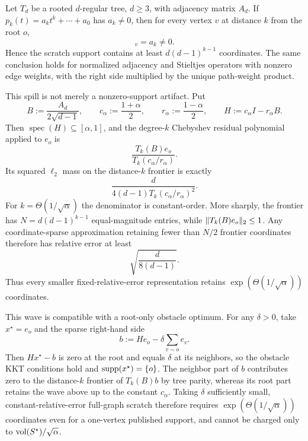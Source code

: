 \begin{proposition}
\label{prop:aesp-cd-polynomial-scratch-spill-stop}
Let $T_d$ be a rooted $d$-regular tree, $d\geq3$, with adjacency matrix
$A_d$.  If
$p_k(t)=a_kt^k+\cdots+a_0$ has $a_k\neq0$, then for every vertex $v$ at
distance $k$ from the root $o$,
\begin{equation}
 [p_k(A_d)e_o]_v=a_k\neq0.
 \label{eq:aesp-cd-polynomial-scratch-spill}
\end{equation}
Hence the scratch support contains at least
$d(d-1)^{k-1}$ coordinates.  The same conclusion holds for normalized
adjacency and Stieltjes operators with nonzero edge weights, with the right
side multiplied by the unique path-weight product.

This spill is not merely a nonzero-support artifact.  Put
\begin{equation*}
 B:=\frac{A_d}{2\sqrt{d-1}},\qquad
 c_\alpha:=\frac{1+\alpha}{2},\qquad
 r_\alpha:=\frac{1-\alpha}{2},\qquad
 H:=c_\alpha I-r_\alpha B.
\end{equation*}
Then $\operatorname{spec}(H)\subseteq[\alpha,1]$, and the degree-$k$ Chebyshev residual
polynomial applied to $e_o$ is
\begin{equation*}
 \frac{T_k(B)e_o}{T_k(c_\alpha/r_\alpha)}.
\end{equation*}
Its squared $\ell_2$ mass on the distance-$k$ frontier is exactly
\begin{equation}
 \frac{d}{4(d-1)T_k(c_\alpha/r_\alpha)^2}.
 \label{eq:aesp-cd-chebyshev-frontier-mass}
\end{equation}
For $k=\Theta(1/\sqrt\alpha)$ the denominator is constant-order.  More
sharply, the frontier has $N=d(d-1)^{k-1}$ equal-magnitude entries, while
$\lVert T_k(B)e_o\rVert_2\leq1$.  Any coordinate-sparse approximation retaining
fewer than $N/2$ frontier coordinates therefore has relative error at least
\begin{equation*}
 \sqrt{\frac{d}{8(d-1)}}.
\end{equation*}
Thus every smaller fixed-relative-error representation retains
$\exp(\Theta(1/\sqrt\alpha))$ coordinates.

This wave is compatible with a root-only obstacle optimum.  For any
$\delta>0$, take $x^\star=e_o$ and the sparse right-hand side
\begin{equation*}
 b:=He_o-\delta\sum_{v\sim o}e_v.
\end{equation*}
Then $Hx^\star-b$ is zero at the root and equals $\delta$ at its neighbors,
so the obstacle KKT conditions hold and $\operatorname{supp}(x^\star)=\{o\}$.  The neighbor
part of $b$ contributes zero to the distance-$k$ frontier of $T_k(B)b$ by
tree parity, whereas its root part retains the wave above up to the constant
$c_\alpha$.  Taking $\delta$ sufficiently small, constant-relative-error
full-graph scratch therefore requires
$\exp(\Theta(1/\sqrt\alpha))$ coordinates even for a one-vertex published
support, and cannot be charged only to $\operatorname{vol}(S^\star)/\sqrt\alpha$.
\end{proposition}

